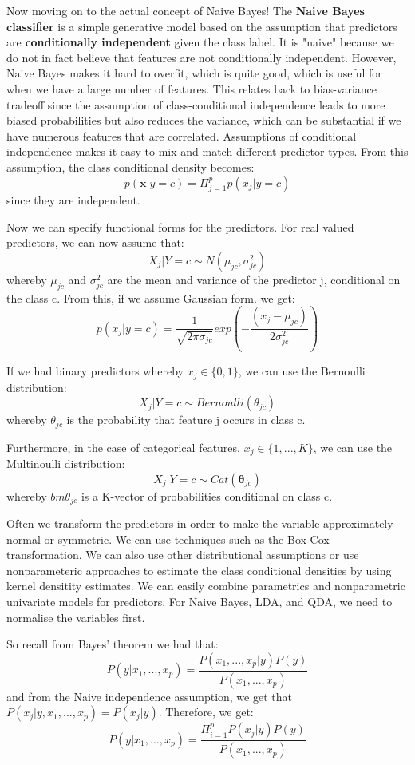 \documentclass[11pt, oneside]{article}
\theoremstyle{definition}
\begin{document}
Now moving on to the actual concept of Naive Bayes! The \textbf{Naive Bayes classifier} is a simple generative model based on the assumption that predictors are \textbf{conditionally independent} given the class label. It is "naive" because we do not in fact believe that features are not conditionally independent. However, Naive Bayes makes it hard to overfit, which is quite good, which is useful for when we have a large number of features. This relates back to bias-variance tradeoff since the assumption of class-conditional independence leads to more biased probabilities but also reduces the variance, which can be substantial if we have numerous features that are correlated. Assumptions of conditional independence makes it easy to mix and match different predictor types. From this assumption, the class conditional density becomes:
$$
p(\bm{x}|y=c) = \Pi_{j=1}^{p}p(x_j|y=c)
$$
since they are independent.

Now we can specify functional forms for the predictors. For real valued predictors, we can now assume that:
$$
X_j|Y = c \sim N(\mu_{jc}, \sigma_{jc}^2)
$$
whereby $\mu_{jc}$ and $\sigma_{jc}^2$ are the mean and variance of the predictor j, conditional on the class c. From this, if we assume Gaussian form. we get:
$$
p(x_j|y=c) = \frac{1}{\sqrt{2\pi \sigma_{jc}}}exp(-\frac{(x_j - \mu_{jc})}{2\sigma_{jc}^2})
$$

If we had binary predictors whereby $x_j \in \{0,1\}$, we can use the Bernoulli distribution:
$$
X_j|Y = c \sim Bernoulli(\theta_{jc})
$$
whereby $\theta_{jc}$ is the probability that feature j occurs in class c.

Furthermore, in the case of categorical features, $x_j \in \{1,...,K\}$, we can use the Multinoulli distribution:
$$
X_j|Y = c \sim Cat(\bm{\theta}_{jc})
$$
whereby $bm{\theta}_{jc}$ is a K-vector of probabilities conditional on class c.

Often we transform the predictors in order to make the variable approximately normal or symmetric. We can use techniques such as the Box-Cox transformation. We can also use other distributional assumptions or use nonparameteric approaches to estimate the class conditional densities by using kernel densitity estimates. We can easily combine parametrics and nonparametric univariate models for predictors. For Naive Bayes, LDA, and QDA, we need to normalise the variables first.

So recall from Bayes' theorem we had that:
$$
P(y|x_1,...,x_p) = \frac{P(x_1,...,x_p|y)P(y)}{P(x_1,...,x_p)}
$$
and from the Naive independence assumption, we get that $P(x_j|y,x_1,...,x_p) = P(x_j|y)$. Therefore, we get:
$$
P(y|x_1,...,x_p) = \frac{\Pi_{i=1}^{p}P(x_j|y)P(y)}{P(x_1,...,x_p)}
$$
\end{document}
